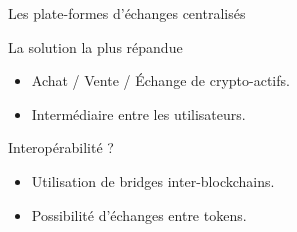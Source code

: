 \begin{frame}{Les plate-formes d'échanges centralisés}
    \begin{block}{La solution la plus répandue}
        \begin{itemize}
            \item Achat / Vente / Échange de crypto-actifs.
            \item Intermédiaire entre les utilisateurs.
        \end{itemize}
    \end{block}
    \pause
    \begin{block}{Interopérabilité ?}
        \begin{itemize}
            \item Utilisation de bridges inter-blockchains.
            \item Possibilité d'échanges entre tokens.
        \end{itemize}
    \end{block}
\end{frame}


